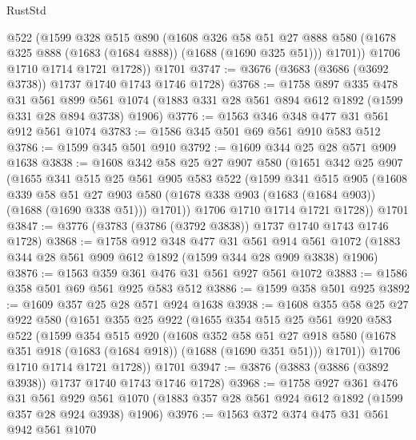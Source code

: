\begin{lexlean}{RustStd}
\begin{coremodule}
        @522
        (@1599
          @328
          @515
          @890
          (@1608
            @326
            @58
            @51
            @27
            @888
            @580
            (@1678 @325 @888 (@1683 (@1684 @888)) (@1688 (@1690 @325 @51)))
            @1701))
        @1706
        @1710
        @1714
        @1721
        @1728))
    @1701
@3747 := @3676 (@3683 (@3686 (@3692 @3738)) @1737 @1740 @1743 @1746 @1728)
@3768 := @1758
    @897
    @335
    @478
    @31
    @561
    @899
    @561
    @1074
    (@1883 @331 @28 @561 @894 @612 @1892 (@1599 @331 @28 @894 @3738) @1906)
@3776 := @1563 @346 @348 @477 @31 @561 @912 @561 @1074
@3783 := @1586 @345 @501 @69 @561 @910 @583 @512
@3786 := @1599 @345 @501 @910
@3792 := @1609 @344 @25 @28 @571 @909 @1638
@3838 := @1608
    @342
    @58
    @25
    @27
    @907
    @580
    (@1651
      @342
      @25
      @907
      (@1655
        @341
        @515
        @25
        @561
        @905
        @583
        @522
        (@1599
          @341
          @515
          @905
          (@1608
            @339
            @58
            @51
            @27
            @903
            @580
            (@1678 @338 @903 (@1683 (@1684 @903)) (@1688 (@1690 @338 @51)))
            @1701))
        @1706
        @1710
        @1714
        @1721
        @1728))
    @1701
@3847 := @3776 (@3783 (@3786 (@3792 @3838)) @1737 @1740 @1743 @1746 @1728)
@3868 := @1758
    @912
    @348
    @477
    @31
    @561
    @914
    @561
    @1072
    (@1883 @344 @28 @561 @909 @612 @1892 (@1599 @344 @28 @909 @3838) @1906)
@3876 := @1563 @359 @361 @476 @31 @561 @927 @561 @1072
@3883 := @1586 @358 @501 @69 @561 @925 @583 @512
@3886 := @1599 @358 @501 @925
@3892 := @1609 @357 @25 @28 @571 @924 @1638
@3938 := @1608
    @355
    @58
    @25
    @27
    @922
    @580
    (@1651
      @355
      @25
      @922
      (@1655
        @354
        @515
        @25
        @561
        @920
        @583
        @522
        (@1599
          @354
          @515
          @920
          (@1608
            @352
            @58
            @51
            @27
            @918
            @580
            (@1678 @351 @918 (@1683 (@1684 @918)) (@1688 (@1690 @351 @51)))
            @1701))
        @1706
        @1710
        @1714
        @1721
        @1728))
    @1701
@3947 := @3876 (@3883 (@3886 (@3892 @3938)) @1737 @1740 @1743 @1746 @1728)
@3968 := @1758
    @927
    @361
    @476
    @31
    @561
    @929
    @561
    @1070
    (@1883 @357 @28 @561 @924 @612 @1892 (@1599 @357 @28 @924 @3938) @1906)
@3976 := @1563 @372 @374 @475 @31 @561 @942 @561 @1070

\end{coremodule}
\end{lexlean}
